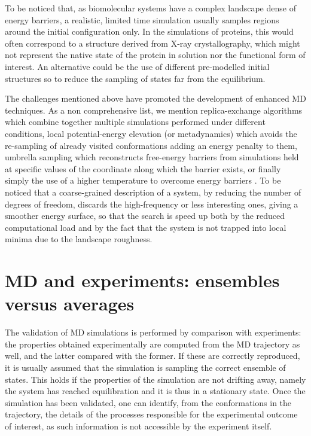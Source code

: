 To be noticed that, as biomolecular systems have a complex landscape dense of energy barriers, a realistic, limited time simulation usually samples regions around the initial configuration only.
%
In the simulations of proteins, this would often correspond to a structure derived from X-ray crystallography, which might not represent the native state of the protein in solution nor the functional form of interest.
%
An alternative could be the use of different pre-modelled initial structures so to reduce the sampling of states far from the equilibrium.

The challenges mentioned above have promoted the development of enhanced MD techniques. As a non comprehensive list, we mention replica-exchange algorithms \citep{Okamoto2004} which combine together multiple simulations performed under different conditions, local potential-energy elevation (or metadynamics) \citep{Huber1994,Laio2002} which avoids the re-sampling of already visited conformations adding an energy penalty to them, umbrella sampling \citep{Torrie1977} which reconstructs free-energy barriers from simulations held at specific values of the coordinate along which the barrier exists, or finally simply the use of a higher temperature to overcome energy barriers \citep{Kirkpatrick1983}.
%
To be noticed that a coarse-grained description of a system, by reducing the number of degrees of freedom, discards the high-frequency or less interesting ones, giving a smoother energy surface, so that the search is speed up both by the reduced computational load and by the fact that the system is not trapped into local minima due to the landscape roughness.


\section{MD and experiments: ensembles versus averages}
The validation of MD simulations is performed by comparison with experiments: the properties obtained experimentally are computed from the MD trajectory as well, and the latter compared with the former. If these are correctly reproduced, it is usually assumed that the simulation is sampling the correct ensemble of states. This holds if the properties of the simulation are not drifting away, namely the system has reached equilibration and it is thus in a stationary state.
%
Once the simulation has been validated, one can identify, from the conformations in the trajectory, the details of the processes responsible for the experimental outcome of interest, as such information is not accessible by the experiment itself.

